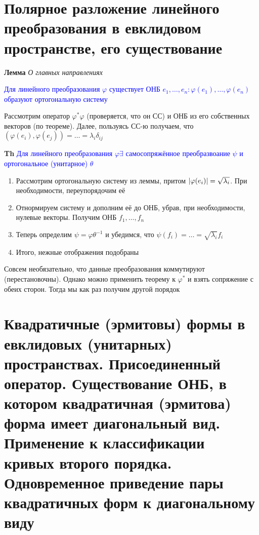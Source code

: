 \documentclass[a4paper, 14pt]{article}
\begin{document}
    \section{Полярное разложение линейного преобразования в евклидовом пространстве, его существование}
    
    \textbf{Лемма} \textit{О главных направлениях}
    
    \textcolor{blue}{Для линейного преобразования $\varphi$ существует
    ОНБ $e_1, \dots, e_n: \varphi(e_1), \dots, \varphi(e_n)$ образуют ортогональную систему}
    
    Рассмотрим оператор $\varphi^* \varphi$ (проверяется, что он СС) и ОНБ из его собственных векторов (по теореме).
    Далее, пользуясь СС-ю получаем, что $(\varphi(e_i), \varphi(e_j)) = \dots = \lambda_i \delta_{ij}$
    
    \textbf{Th} \textcolor{blue}{Для линейного преобразования $\varphi \exists$ самосопряжённое
    преобразвоание $\psi$ и ортогональное (унитарное) $\theta$}
    
    \begin{enumerate}
        \item Рассмотрим ортогональную систему из леммы, притом $\abs{\varphi(e_i)} = \sqrt{\lambda_i}$.
        При необходимости, переупорядочим её
        \item Отнормируем систему и дополним её до ОНБ, убрав, при необходимости, нулевые векторы.
        Получим ОНБ $f_1, \dots, f_n$
        \item Теперь определим $\psi = \varphi \theta^{-1}$ и убедимся, что $\psi(f_i) = \dots = \sqrt{\lambda_i} f_i$
        \item Итого, нежные отображения подобраны
    \end{enumerate}
    
    Совсем необязательно, что данные преобразования коммутируют (перестановочны).
    Однако можно применить теорему к $\varphi^*$ и взять сопряжение с обеих сторон.
    Тогда мы как раз получим другой порядок
    
    \section{Квадратичные (эрмитовы) формы в евклидовых (унитарных) пространствах.
    Присоединенный оператор.
    Существование ОНБ, в котором квадратичная (эрмитова) форма имеет диагональный вид.
    Применение к классификации кривых второго порядка.
    Одновременное приведение пары квадратичных форм к диагональному виду}
    
\end{document}
